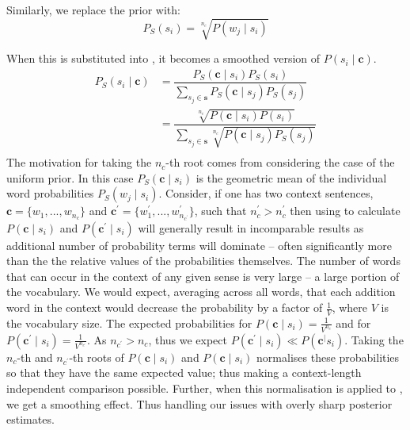 \documentclass{sig-alternate}
\renewcommand{\c}{\mathbf{c}}
\newcommand{\s}{\mathbf{s}}
\begin{document}
Similarly, we replace the prior with:
\begin{equation} \label{eq:priorsmoothed}
P_S(s_{i})= \sqrt[n_c]{P(w_{j} \mid s_{i})}
\end{equation}


When this is substituted into , it becomes a smoothed version of $P(s_{i} \mid \c)$.
\begin{equation} \label{eq:generalwsdsmoothed}
\begin{aligned}
P_S(s_{i}\mid\c) %
&=\dfrac{P_{S}(\c\mid s_{i})P_S(s_{i})}
{\sum_{s_{j}\in\s} P_{S}(\c \mid s_{j}) P_S(s_{j})} \\
%
&=\dfrac{\sqrt[n_c]{P(\c\mid s_{i})P(s_{i})}}
{\sum_{s_{j}\in\s} \sqrt[n_c]{P(\c \mid s_{j})P_S(s_{j})}} \\
%
\end{aligned}
\end{equation}
The motivation for taking the $n_c$-th root comes from considering the case of the uniform prior.
In this case $P_S(\c \mid s_{i})$ is the geometric mean of the individual word probabilities $P_S(w_j \mid s_{i})$.
Consider, if one has two context sentences, $\c=\{w_1,...,w_{n_c}\}$ and $\c^\prime=\{w_1^\prime,...,w^\prime_{n_{c^\prime}}\}$, such that $n_c^\prime > n_c^\prime$
then using  to calculate $P(\c \mid s_{i})$ and $P(\c^\prime \mid s_{i})$ will generally result in incomparable results as additional number of probability terms will dominate -- often significantly more than the the relative values of the probabilities themselves.
The number of words that can occur in the context of any given sense is very large -- a large portion of the vocabulary. We would expect, averaging across all words, that each addition word in the context would decrease the probability by a factor of $\frac{1}{V}$, where  $V$ is the vocabulary size. 
The expected probabilities for $P(\c \mid s_{i}) = \frac{1}{V^{n_c}}$ and for $P(\c^\prime \mid s_{i}) = \frac{1}{V^{n_{c^\prime}}}$. As $n_{c^\prime} > n_c$, thus we expect $P(\c^\prime \mid s_{i}) \ll P(\c^ \mid s_{i})$.
Taking the $n_{c}$-th and $n_{c^\prime}$-th roots of $P(\c \mid s_{i})$ and $P(\c \mid s_{i})$ normalises these probabilities so that they have the same expected value; thus making a context-length independent comparison possible.
Further, when this normalisation is applied to , we get a smoothing effect. Thus handling our issues with overly sharp posterior estimates.
\end{document}
